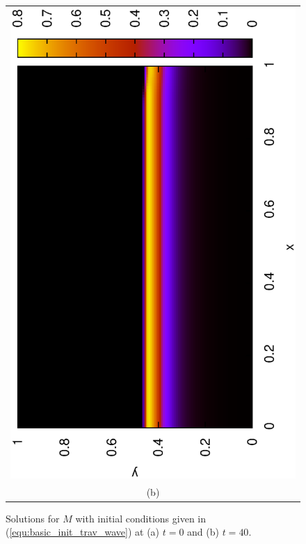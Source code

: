 \begin{figure}
\begin{tabular}{c}
      \includegraphics[scale = 0.5, angle = 270]{basic_trav_t40}\\
      (b) 
    \end{tabular}
    \caption{Solutions for $M$ with initial conditions given in (\ref{equ:basic_init_trav_wave}) at (a) $t = 0$ and (b) $t = 40$.}
    \label{fig:basic_trav}
  \end{figure}

